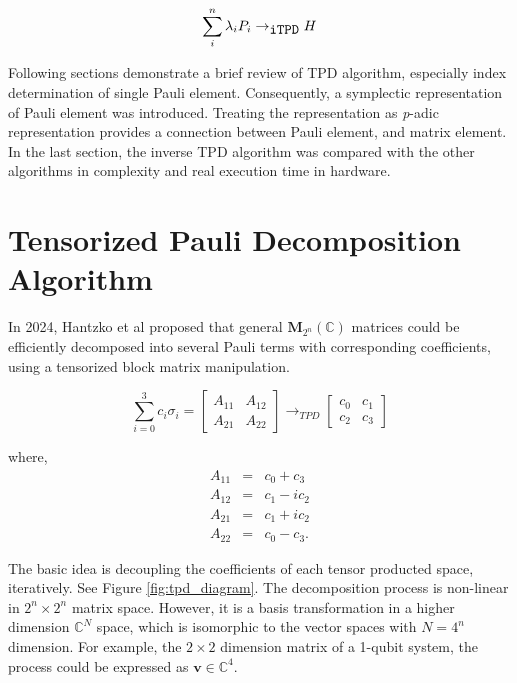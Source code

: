 \documentclass[twocolumn]{article}
\begin{document}
\begin{equation}
    \sum_i^n \lambda_i P_i \rightarrow_{\mbox{\texttt{iTPD}}} H
\end{equation}

Following sections demonstrate a brief review of TPD algorithm, especially
index determination of single Pauli element. 
Consequently, a symplectic representation of Pauli element was introduced.
Treating the representation as \textit{p}-adic representation provides a connection between Pauli element, and matrix element.
In the last section, the inverse TPD algorithm was compared with 
the other algorithms in complexity and real execution time in hardware.

\section{Tensorized Pauli Decomposition Algorithm}

In 2024, Hantzko et al proposed that 
general $\mathbf{M}_{2^n}(\mathbb{C})$ matrices could be efficiently decomposed into 
several Pauli terms with corresponding coefficients, using a tensorized block matrix manipulation\cite{Hantzko_2024}.

\begin{equation}
    \sum_{i=0}^3 c_i \sigma_i = 
    \begin{bmatrix}
        A_{11} & A_{12}\\
        A_{21} & A_{22}
    \end{bmatrix}
    \rightarrow_{TPD}
    \begin{bmatrix}
        c_0 & c_1\\
        c_2 & c_3
    \end{bmatrix}
\end{equation}

where, 
\begin{equation}
    \label{eq:tpd_transform}
    \begin{array}{ccc}
        A_{11} & = &  c_0 + c_3\\
        A_{12} & = &  c_1 - i c_2\\
        A_{21} & = &  c_1 + i c_2\\
        A_{22} & = &  c_0 - c_3.
    \end{array}
\end{equation}

The basic idea is decoupling the coefficients of each tensor producted space, iteratively. 
See Figure \ref{fig:tpd_diagram}.
The decomposition process is non-linear in $2^n \times 2^n$ matrix space. 
However, it is a basis transformation in a higher dimension $\mathbb{C}^N$ space, 
which is isomorphic to the vector spaces with $N = 4^n$ dimension.
For example, the $2 \times 2$ dimension matrix of a 1-qubit system, the process could be expressed as 
$\mathbf{v} \in \mathbb{C}^4$. 
\end{document}
